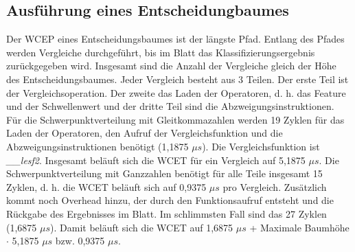 \subsection{Ausführung eines Entscheidungbaumes}
Der WCEP eines Entscheidungsbaumes ist der längste Pfad. Entlang des Pfades werden Vergleiche durchgeführt, bis im Blatt das Klassifizierungsergebnis zurückgegeben wird. Insgesamt sind die Anzahl der Vergleiche gleich
der Höhe des Entscheidungsbaumes.
\newline
\newline
Jeder Vergleich besteht aus 3 Teilen. Der erste Teil ist der Vergleichsoperation. Der zweite das Laden der Operatoren, d. h. das Feature und der Schwellenwert und der dritte Teil sind die Abzweigungsinstruktionen. Für
die Schwerpunktverteilung mit Gleitkommazahlen werden 19 Zyklen für das Laden der Operatoren, den Aufruf der Vergleichsfunktion und die Abzweigungsinstruktionen benötigt (1,1875 $\mu s$). Die Vergleichsfunktion ist
\textit{\_\_lesf2}. Insgesamt beläuft sich die WCET für ein Vergleich auf 5,1875 $\mu s$. Die Schwerpunktverteilung mit Ganzzahlen benötigt für alle Teile insgesamt 15 Zyklen, d. h. die WCET beläuft sich
auf 0,9375 $\mu s$ pro Vergleich.
\newline
\newline
Zusätzlich kommt noch Overhead hinzu, der durch den Funktionsaufruf entsteht und die Rückgabe des Ergebnisses im Blatt. Im schlimmsten Fall sind das 27 Zyklen (1,6875 $\mu s$). Damit beläuft sich die WCET auf
1,6875 $\mu s$ + Maximale Baumhöhe $\cdot$ 5,1875 $\mu s$ bzw. 0,9375 $\mu s$.